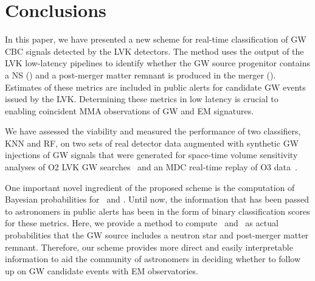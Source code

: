 \section{Conclusions\label{conclusions}}


In this paper, we have presented a new scheme for real-time classification of \ac{GW} \ac{CBC} signals detected by the \ac{LVK} detectors. The method uses the
output of the \ac{LVK} low-latency pipelines to identify whether the GW source progenitor contains a \ac{NS} (\hasns) and a post-merger matter remnant is produced in the merger
(\hasrem). Estimates of these metrics are included in public alerts for candidate \ac{GW} events issued by the \ac{LVK}. Determining these metrics in low latency is crucial to
enabling coincident \ac{MMA} observations of GW and \ac{EM} signatures.

We have assessed the viability and measured the performance of two classifiers, \ac{KNN} and \ac{RF}, on two sets of real detector data augmented with synthetic GW injections of
GW signals that were generated for space-time volume sensitivity analyses of \ac{O2} \ac{LVK} \ac{GW} searches~\cite{Chatterjee:2019avs} and an \ac{MDC} real-time
replay of \ac{O3} data~\cite{Chaudhary:2023vec}. 


One important novel ingredient of the proposed scheme is the computation of Bayesian probabilities for \hasns\ and \hasrem. Until now, the information that has been passed to
astronomers in public alerts has been in the form of binary classification scores for these metrics. Here, we provide a method to compute \hasns\ and \hasrem\ as actual
probabilities that the \ac{GW} source includes a neutron star and post-merger matter remnant. Therefore, our scheme provides more direct and easily interpretable information to aid the community
of astronomers in deciding whether to follow up on \ac{GW} candidate events with \ac{EM} observatories.


